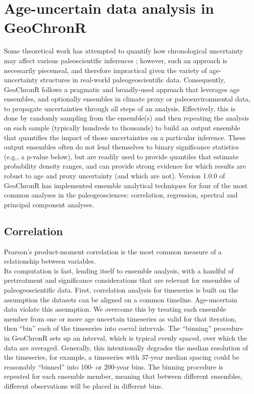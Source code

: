 \documentclass[gchron, manuscript]{copernicus}
\begin{document}
\hypertarget{sec:age-uncertain-analysis}{%
\section{Age-uncertain data analysis in GeoChronR}\label{sec:age-uncertain-analysis}}

Some theoretical work has attempted to quantify how chronological uncertainty may affect various paleoscientific inferences \citep[e.g.][]{HuybersWunsch2004}; however, such an approach is necessarily piecemeal, and therefore impractical given the variety of age-uncertainty structures in real-world paleogeoscientific data.
Consequently, GeoChronR follows a pragmatic and broadly-used approach that leverages age ensembles, and optionally ensembles in climate proxy or paleoenvironmental data, to propagate uncertainties through all steps of an analysis.
Effectively, this is done by randomly sampling from the ensemble(s) and then repeating the analysis on each sample (typically hundreds to thousands) to build an output ensemble that quantifies the impact of those uncertainties on a particular inference.
These output ensembles often do not lend themselves to binary significance statistics (e.g., a p-value below), but are readily used to provide quantiles that estimate probability density ranges, and can provide strong evidence for which results are robust to age and proxy uncertainty (and which are not).
Version 1.0.0 of GeoChronR has implemented ensemble analytical techniques for four of the most common analyses in the paleogeosciences: correlation, regression, spectral and principal component analyses.

\subsection{Correlation}

Pearson's product-moment correlation is the most common measure of a relationship between variables.\\
Its computation is fast, lending itself to ensemble analysis, with a handful of pretreatment and significance considerations that are relevant for ensembles of paleogeoscientific data.
First, correlation analysis for timeseries is built on the assumption the datasets can be aligned on a common timeline.
Age-uncertain data violate this assumption.
We overcome this by treating each ensemble member from one or more age uncertain timeseries as valid for that iteration, then ``bin'' each of the timeseries into coeval intervals.
The ``binning'' procedure in GeoChronR sets up an interval, which is typical evenly spaced, over which the data are averaged.
Generally, this intentionally degrades the median resolution of the timeseries, for example, a timeseries with 37-year median spacing could be reasonably ``binned'' into 100- or 200-year bins.
The binning procedure is repeated for each ensemble member, meaning that between different ensembles, different observations will be placed in different bins.
\end{document}
